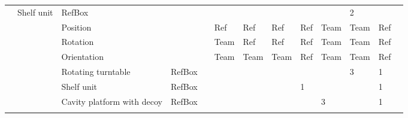 \begin{landscape}
\begin{table}[h!]
\begin{tabular}{|l|l|l|l*{9}{|P{1cm}}|}
         & Shelf unit       & RefBox   &       &       &       &       &       &       &    & 2   \\ \hhline{~~----------}
      &  & Position         &          &       &   Ref  &   Ref  &  Ref  &  Ref   &   Team  & Team & Ref  \\ \hhline{~~----------}
      &  & Rotation         &          &       &  Team &   Ref   &  Ref    &  Ref    &   Team  & Team& Ref   \\ \hhline{~~-----------}
      &  & Orientation      &          &       &  Team &   Team  &  Team   &  Ref    &  Team  &Team & Ref   \\ \hhline{~~-----------}
      &  & Rotating turntable& RefBox  &       &       &       &       &       &        & 3  & 1   \\ 
      \hhline{~-----------} 
      & 
         & Shelf unit          & RefBox &       &       &       &      &   1     &        &   & 1   \\ \hhline{~~----------}
      &  & Cavity platform with decoy& RefBox &       &       &       &       &       &  3   &   & 1   \\ \hhline{~~----------}

\end{tabular}
\end{table}
\end{landscape}
